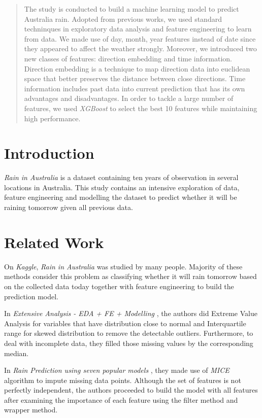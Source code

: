 \documentclass{article}
\begin{document}
\begin{abstract}
The study is conducted to build a machine learning model to predict Australia rain. Adopted from previous works, we used standard techninques in exploratory data analysis and feature engineering to learn from data. We made use of day, month, year features instead of date since they appeared to affect the weather strongly. Moreover, we introduced two new classes of features: direction embedding and time information. Direction embedding is a technique to map direction data into euclidean space that better preserves the distance between close directions. Time information includes past data into current prediction that has its own advantages and disadvantages. In order to tackle a large number of features, we used \textit{XGBoost} to select the best 10 features while maintaining high performance.
\end{abstract}

\section{Introduction}
\label{introduction}
\textit{Rain in Australia} is a dataset containing ten years of observation in several locations in Australia. This study contains an intensive exploration of data, feature engineering and modelling the dataset to predict whether it will be raining tomorrow given all previous data.

\section{Related Work}
On \textit{Kaggle}, \textit{Rain in Australia} was studied by many people. Majority of these methods consider this problem as classifying whether it will rain tomorrow based on the collected data today together with feature engineering to build the prediction model.

In \textit{Extensive Analysis - EDA + FE + Modelling} \cite{prashant111}, the authors did Extreme Value Analysis for variables that have distribution close to normal and Interquartile range for skewed distribution to remove the detectable outliers. Furthermore, to deal with incomplete data, they filled those missing values by the corresponding median.

In \textit{Rain Prediction using seven popular models} \cite{chandrimad31}, they made use of  \textit{MICE} algorithm \cite{mice} to impute missing data points. Although the set of features is not perfectly independent, the authors proceeded to build the model with all features after examining the importance of each feature using the filter method and wrapper method.
\end{document}
